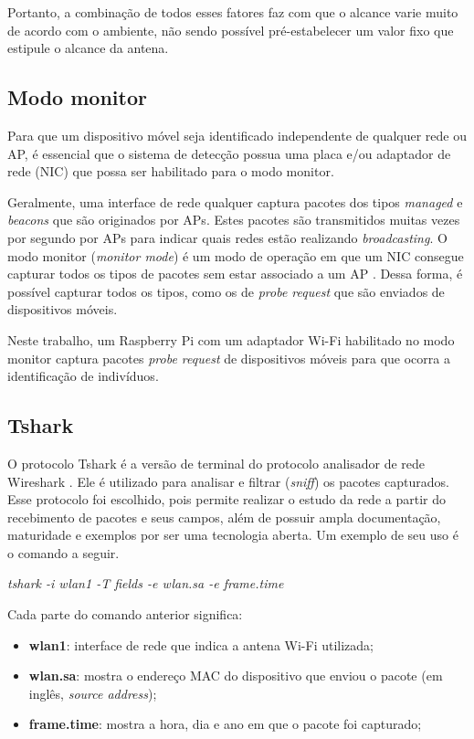 Portanto, a combinação de todos esses fatores faz com que o alcance varie muito de acordo com o ambiente, não sendo possível pré-estabelecer um valor fixo que estipule o alcance da antena.

\subsection{Modo monitor}
\label{modo-monitor}
Para que um dispositivo móvel seja identificado independente de qualquer rede ou AP, é essencial que o sistema de detecção possua uma placa e/ou adaptador de rede (NIC) que possa ser habilitado para o modo monitor.

Geralmente, uma interface de rede qualquer captura pacotes dos tipos \emph{managed} e \emph{beacons} que são originados por APs. Estes pacotes são transmitidos
muitas vezes por segundo por APs para indicar quais redes estão realizando \emph{broadcasting}. O modo monitor (\emph{monitor mode}) é um modo de operação em que um NIC consegue capturar todos os tipos de pacotes sem estar associado a um AP \cite{Acrylic} \cite{Wireshark2017b}. Dessa forma, é possível capturar todos os tipos, como os de \emph{probe request} que são enviados de dispositivos móveis.

Neste trabalho, um Raspberry Pi com um adaptador Wi-Fi habilitado no modo monitor captura pacotes \emph{probe request} de dispositivos móveis
para que ocorra a identificação de indivíduos.

\subsection{Tshark}
\label{tshark-section}
O protocolo Tshark é a versão de terminal do protocolo
analisador de rede Wireshark \cite{Wireshark2017} \cite{Wireshark2017a}. Ele é
utilizado para analisar e filtrar (\emph{sniff}) os
pacotes capturados. Esse protocolo foi
escolhido, pois permite realizar o estudo da rede a partir do recebimento de
pacotes e seus campos, além de possuir ampla documentação, maturidade e exemplos
por ser uma tecnologia aberta. Um exemplo de seu uso é o comando a seguir.

\begin{center}
\emph{tshark -i wlan1 -T fields -e wlan.sa -e frame.time}
\end{center}

Cada parte do comando anterior significa:
\begin{itemize}
  \item \textbf{wlan1}: interface de rede que indica a antena Wi-Fi utilizada;
  \item \textbf{wlan.sa}: mostra o endereço MAC do dispositivo que enviou o pacote (em inglês, \emph{source address});
  \item \textbf{frame.time}: mostra a hora, dia e ano em que o pacote foi capturado;
\end{itemize}

